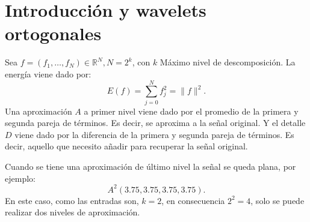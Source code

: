 \chapter{Introducción y wavelets ortogonales }
\setlength{\columnsep}{1cm} %

\begin{paracol}{2}
Sea $f=\left(f_1,\ldots,f_N\right)\in \mathbb{R}^N$$, N=2^k$, con $k$ Máximo nivel de descomposición. La energía viene dado por:
$$E(f)=\sum_{j=0}^{N}f_j^2=\|f\|^2.$$
Una aproximación $A$ a primer nivel viene dado por el promedio de la primera y segunda pareja de términos. Es decir, se aproxima a la señal original. Y el detalle $D$ viene dado por la diferencia de la primera y segunda pareja de términos. Es decir, aquello que necesito añadir para recuperar la señal original. 

Cuando se tiene una aproximación de último nivel la señal se queda plana, por ejemplo:
$$A^2(3.75,3.75,3.75,3.75).$$
En este caso, como las entradas son, $k=2$, en consecuencia $2^2=4$, solo se puede realizar dos niveles de aproximación. 


\end{paracol}
